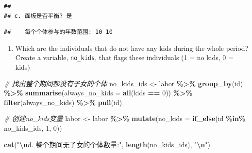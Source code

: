 \documentclass[
]{article}
\newenvironment{Shaded}{\begin{snugshade}}{\end{snugshade}}
\newcommand{\AttributeTok}[1]{\textcolor[rgb]{0.13,0.29,0.53}{#1}}
\newcommand{\CommentTok}[1]{\textcolor[rgb]{0.56,0.35,0.01}{\textit{#1}}}
\newcommand{\DecValTok}[1]{\textcolor[rgb]{0.00,0.00,0.81}{#1}}
\newcommand{\FunctionTok}[1]{\textcolor[rgb]{0.13,0.29,0.53}{\textbf{#1}}}
\newcommand{\NormalTok}[1]{#1}
\newcommand{\OtherTok}[1]{\textcolor[rgb]{0.56,0.35,0.01}{#1}}
\newcommand{\SpecialCharTok}[1]{\textcolor[rgb]{0.81,0.36,0.00}{\textbf{#1}}}
\newcommand{\StringTok}[1]{\textcolor[rgb]{0.31,0.60,0.02}{#1}}
\providecommand{\tightlist}{%
  \setlength{\itemsep}{0pt}\setlength{\parskip}{0pt}}
\begin{document}
\begin{verbatim}
## 
## c. 面板是否平衡? 是
\end{verbatim}

\begin{Shaded}
\end{Shaded}

\begin{verbatim}
##    每个个体参与的年数范围: 10 10
\end{verbatim}

\begin{enumerate}
\def\labelenumi{\alph{enumi}.}
\setcounter{enumi}{3}
\tightlist
\item
  Which are the individuals that do not have any kids during the whole
  period? Create a variable, \texttt{no\_kids}, that flags these
  individuals (1 = no kids, 0 = kids)
\end{enumerate}

\begin{Shaded}
\begin{Highlighting}[]
\CommentTok{\# 找出整个期间都没有子女的个体}
\NormalTok{no\_kids\_ids }\OtherTok{\textless{}{-}}\NormalTok{ labor }\SpecialCharTok{\%\textgreater{}\%}
  \FunctionTok{group\_by}\NormalTok{(id) }\SpecialCharTok{\%\textgreater{}\%}
  \FunctionTok{summarise}\NormalTok{(}\AttributeTok{always\_no\_kids =} \FunctionTok{all}\NormalTok{(kids }\SpecialCharTok{==} \DecValTok{0}\NormalTok{)) }\SpecialCharTok{\%\textgreater{}\%}
  \FunctionTok{filter}\NormalTok{(always\_no\_kids) }\SpecialCharTok{\%\textgreater{}\%}
  \FunctionTok{pull}\NormalTok{(id)}

\CommentTok{\# 创建no\_kids变量}
\NormalTok{labor }\OtherTok{\textless{}{-}}\NormalTok{ labor }\SpecialCharTok{\%\textgreater{}\%}
  \FunctionTok{mutate}\NormalTok{(}\AttributeTok{no\_kids =} \FunctionTok{if\_else}\NormalTok{(id }\SpecialCharTok{\%in\%}\NormalTok{ no\_kids\_ids, }\DecValTok{1}\NormalTok{, }\DecValTok{0}\NormalTok{))}

\FunctionTok{cat}\NormalTok{(}\StringTok{"}\SpecialCharTok{\textbackslash{}n}\StringTok{d. 整个期间无子女的个体数量:"}\NormalTok{, }\FunctionTok{length}\NormalTok{(no\_kids\_ids), }\StringTok{"}\SpecialCharTok{\textbackslash{}n}\StringTok{"}\NormalTok{)}
\end{Highlighting}
\end{Shaded}
\end{document}
